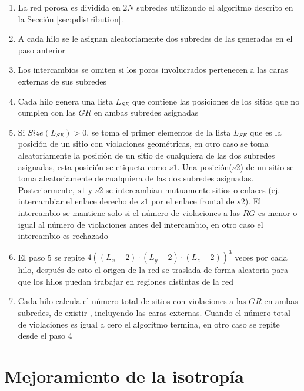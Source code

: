 \begin{enumerate}
\item La red porosa es dividida en $2N$ subredes utilizando el algoritmo descrito en la Sección \ref{sec:pdistribution}.

\item A cada hilo se le asignan aleatoriamente dos subredes de las generadas en el paso anterior

\item Los intercambios se omiten si los poros involucrados pertenecen a las caras  externas de sus subredes

\item Cada hilo genera una lista $L_{SE}$ que contiene las posiciones de los sitios que no cumplen con las $GR$ en ambas subredes asignadas 

\item Si $Size(L_{SE}) > 0$, se toma el primer elementos de la lista $L_{SE}$ que es la posición de un sitio con violaciones geométricas, en otro caso se toma aleatoriamente la posición de un sitio de cualquiera de las dos subredes asignadas, esta posición se etiqueta como $s1$. Una posición($s2$) de un sitio se toma aleatoriamente de cualquiera de las dos subredes asignadas. Posteriormente, $s1$ y $s2$ se intercambian mutuamente sitios o enlaces (ej. intercambiar el enlace derecho de $s1$ por el enlace frontal de $s2$). El intercambio se mantiene solo si el número de violaciones a las $RG$ es menor o igual al número de violaciones antes del intercambio, en otro caso el intercambio es rechazado

\item El paso 5 se repite $4(( L_x  - 2) \cdot (L_y - 2) \cdot (L_z - 2))^3$ veces por cada hilo, después de esto el origen de la red se traslada de forma aleatoria para que los hilos puedan trabajar en regiones distintas de la red

\item Cada hilo calcula el número total de sitios con violaciones a las $GR$ en ambas subredes, de existir , incluyendo las caras externas. Cuando el número total de violaciones es igual a cero el algoritmo termina, en otro caso se repite desde el paso 4
\end{enumerate}

\section{Mejoramiento de la isotropía}
\label{subsec:pisotropy}